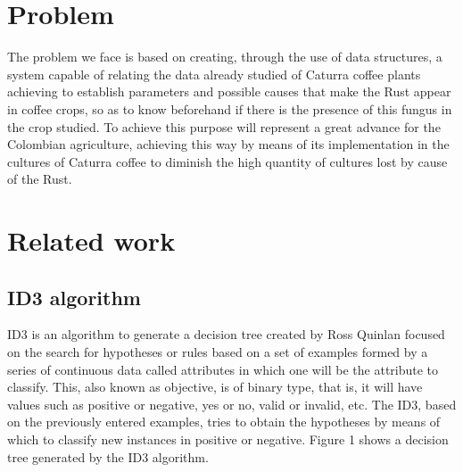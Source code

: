 \documentclass{acm_proc_article-sp}
\begin{document}
\section{Problem}
The problem we face is based on creating, through the use of data structures, a system capable of relating the data already studied of Caturra coffee plants achieving to establish parameters and possible causes that make the Rust appear in coffee crops, so as to know beforehand if there is the presence of this fungus in the crop studied.
To achieve this purpose will represent a great advance for the Colombian agriculture, achieving this way by means of its implementation in the cultures of Caturra coffee to diminish the high quantity of cultures lost by cause of the Rust.

\section{Related work}
\subsection{ID3 algorithm}
ID3 is an algorithm to generate a decision tree created by Ross Quinlan focused on the search for hypotheses or rules based on a set of examples formed by a series of continuous data called attributes in which one will be the attribute to classify. This, also known as objective, is of binary type, that is, it will have values such as positive or negative, yes or no, valid or invalid, etc.
The ID3, based on the previously entered examples, tries to obtain the hypotheses by means of which to classify new instances in positive or negative. Figure 1 shows a decision tree generated by the ID3 algorithm.
\end{document}

